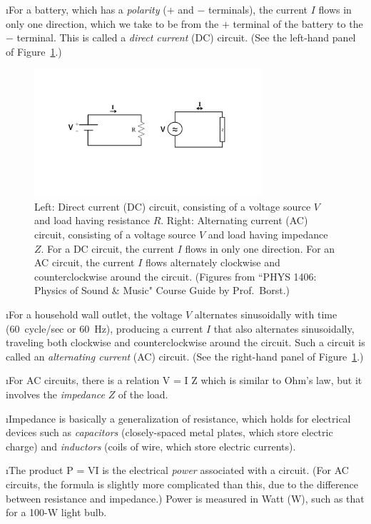 \i For a battery, which has a {\em polarity} ($+$ and 
$-$ terminals), the current $I$ flows in only one direction, 
which we take to be from the $+$ terminal of the battery 
to the $-$ terminal.
This is called a {\em direct current} (DC) circuit.
(See the left-hand panel of Figure~\ref{f:circuits_DC_AC}.)
%
\begin{figure}[htbp]
\begin{center}
\includegraphics[width=0.75\textwidth]{circuits_DC_AC}
\caption{Left: Direct current (DC) circuit, consisting
of a voltage source $V$ and load having resistance $R$.
Right: Alternating current (AC) circuit, consisting of
a voltage source $V$ and load having impedance $Z$.
For a DC circuit, the current $I$ flows in only one direction.
For an AC circuit, the current $I$ flows alternately clockwise and
counterclockwise around the circuit.
(Figures from ``PHYS 1406: Physics of Sound \& Music" 
Course Guide by Prof.~Borst.)}
\label{f:circuits_DC_AC}
\end{center}
\end{figure}

\i For a household wall outlet, the voltage $V$ alternates
sinusoidally with time (60~cycle/sec or 60~Hz), 
producing a current $I$ that 
also alternates sinusoidally, traveling both clockwise and 
counterclockwise around the circuit.
Such a circuit is called an {\em alternating current} (AC) circuit.
(See the right-hand panel of Figure~\ref{f:circuits_DC_AC}.)

\i For AC circuits, there is a relation 
%
\be
V = I Z
\ee
%
which is similar to Ohm's law, but it involves the {\em impedance}
$Z$ of the load.

\i Impedance is basically a generalization of resistance, which holds
for electrical devices such as {\em capacitors} (closely-spaced metal 
plates, which store electric charge) and {\em inductors} (coils of wire, 
which store electric currents).

\i The product 
%
\be
P = VI
\ee
%
is the electrical {\em power} associated with a circuit.
(For AC circuits, the formula is slightly more complicated than this,
due to the difference between resistance and impedance.)
Power is measured in Watt (W), such as that for a 100-W light bulb.

